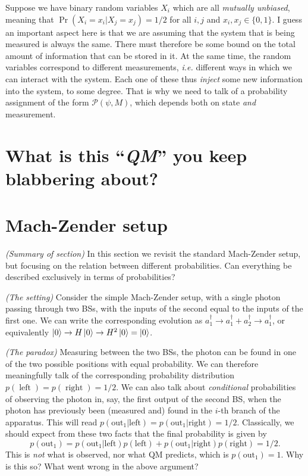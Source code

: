 \documentclass[12pt]{report}
\newcommand{\on}[1]{\operatorname{#1}}
\newcommand{\calP}{{\mathcal{P}}}
\newcommand{\heading}[1]{{\color{Mahogany}\emph{(#1)}}}
\begin{document}
Suppose we have binary random variables $X_i$ which are all \emph{mutually unbiased}, meaning that $\Pr(X_i=x_i|X_j=x_j)=1/2$ for all $i,j$ and $x_i,x_j\in\{0,1\}$. I guess an important aspect here is that we are assuming that the system that is being measured is always the same. There must therefore be some bound on the total amount of information that can be stored in it.
At the same time, the random variables correspond to different measurements, \emph{i.e.} different ways in which we can interact with the system. Each one of these thus \emph{inject} some new information into the system, to some degree.
That is why we need to talk of a probability assignment of the form $\calP(\psi,M)$, which depends both on state \emph{and} measurement.

\section{What is this ``\emph{QM}'' you keep blabbering about?}

\section{Mach-Zender setup}

\heading{Summary of section}
In this section we revisit the standard Mach-Zender setup, but focusing on the relation between different probabilities.
Can everything be described exclusively in terms of probabilities?

\heading{The setting}
Consider the simple Mach-Zender setup, with a single photon passing through two BSs, with the inputs of the second equal to the inputs of the first one. We can write the corresponding evolution as
$a_1^\dagger\to a_1^\dagger + a_2^\dagger \to a_1^\dagger$, or equivalently $\ket0\to H\ket0\to H^2\ket0=\ket0$.

\heading{The paradox}
Measuring between the two BSs, the photon can be found in one of the two possible positions with equal probability. We can therefore meaningfully talk of the corresponding probability distribution $p(\on{left})=p(\on{right})=1/2$.
We can also talk about \emph{conditional} probabilities of observing the photon in, say, the first output of the second BS, when the photon has previously been (measured and) found in the $i$-th branch of the apparatus.
This will read $p(\text{out}_1|\text{left})=p(\text{out}_1|\text{right})=1/2$.
Classically, we should expect from these two facts that the final probability is given by
\begin{equation}
	p(\text{out}_1) =
	p(\text{out}_1|\text{left}) p(\text{left})
	+ p(\text{out}_1|\text{right}) p(\text{right}) = 1/2.
	\label{MZ:eq:conditional_probabilities_classical_law}
\end{equation}
This is \emph{not} what is observed, nor what QM predicts, which is $p(\text{out}_1)=1$.
Why is this so? What went wrong in the above argument?
\end{document}
